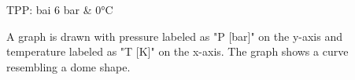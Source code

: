 TPP: bai 6 bar & 0°C  

A graph is drawn with pressure labeled as "P [bar]" on the y-axis and temperature labeled as "T [K]" on the x-axis. The graph shows a curve resembling a dome shape.